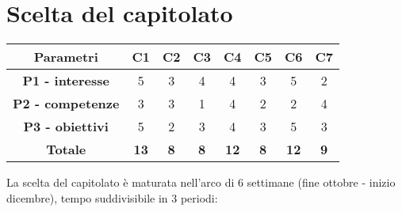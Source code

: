 \section{Scelta del capitolato}
\begin{center}
	\begin{longtable}{|c|c|c|c|c|c|c|c|}
		\hline
		\rowcolor{lighter-grayer}
		\textbf{Parametri} & \textbf{C1} & \textbf{C2} & \textbf{C3} & \textbf{C4} & \textbf{C5}  & \textbf{C6}  & \textbf{C7}  \\
		\hline
		\endfirsthead
		
		
		\hline
		\textbf{P1 - interesse} & 5 & 3 & 4 & 4 & 3 & 5 & 2 \\
		\hline
		\textbf{P2 - competenze} & 3 & 3 & 1 & 4 & 2 & 2 & 4 \\
		\hline
		\textbf{P3 - obiettivi} & 5 & 2 & 3 & 4 & 3 & 5 & 3 \\
		\hline
		
		\hline
		\textbf{Totale} & \textbf{13} & \textbf{8} & \textbf{8} & \textbf{12} & \textbf{8}  & \textbf{12}  & \textbf{9}  \\
		\hline	
	\end{longtable}

\end{center}
La scelta del capitolato è maturata nell'arco di 6 settimane (fine ottobre - inizio dicembre), tempo suddivisibile in 3 periodi:
